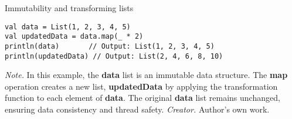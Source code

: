 \begin{table}[h!]
\caption{Immutability and transforming lists}
\begin{lstlisting}
val data = List(1, 2, 3, 4, 5)
val updatedData = data.map(_ * 2)
println(data)       // Output: List(1, 2, 3, 4, 5)
println(updatedData) // Output: List(2, 4, 6, 8, 10)
\end{lstlisting}
\small
\textit{Note.} In this example, the \textbf{data} list is an immutable data structure. The \textbf{map} operation creates a new list, \textbf{updatedData} by applying the transformation function to each element of \textbf{data}. The original \textbf{data} list remains unchanged, ensuring data consistency and thread safety.
\textit{Creator.} Author's own work.
\end{table}